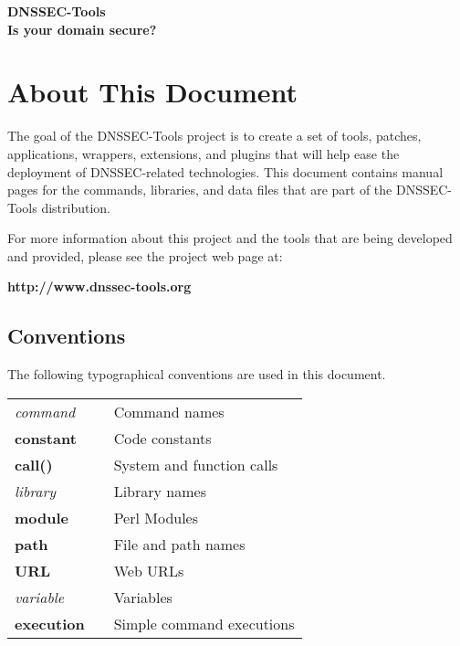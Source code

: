\documentclass[12pt]{article}
\newcommand{\cmd}[1]{{\em #1}}
\newcommand{\const}[1]{{\bf #1}}
\newcommand{\func}[1]{{\bf #1}}
\newcommand{\lib}[1]{{\em #1}}
\newcommand{\perlmod}[1]{{\bf #1}}
\newcommand{\path}[1]{{\bf #1}}
\newcommand{\url}[1]{{\bf #1}}
\newcommand{\var}[1]{{\em #1}}
\newcommand{\xqt}[1]{{\bf #1}}
\begin{document}
\clearpage

\begin{center}
{\Large
{\bf DNSSEC-Tools\\
Is your domain secure?}}
\end{center}
\tableofcontents
{}


\clearpage

\section{About This Document}
\label{about}

The goal of the DNSSEC-Tools project is to create a set of tools, patches,
applications, wrappers, extensions, and plugins that will help ease the
deployment of DNSSEC-related technologies. This document contains manual
pages for the commands, libraries, and data files that are part of the
DNSSEC-Tools distribution.

For more information about this project and the tools that are being developed
and provided, please see the project web page at:

\url{http://www.dnssec-tools.org}

\vspace{.25in}

\subsection{Conventions}

The following typographical conventions are used in this document.

\begin{table}[hb]
\begin{tabular}{lll}
\cmd{command}		& & Command names\\
\const{constant}	& & Code constants\\
\func{call()}		& & System and function calls\\
\lib{library}		& & Library names\\
\perlmod{module}	& & Perl Modules\\
\path{path}		& & File and path names\\
\url{URL}		& & Web URLs\\
\var{variable}		& & Variables\\
\xqt{execution}		& & Simple command executions\\
\end{tabular}
\end{table}
\end{document}
